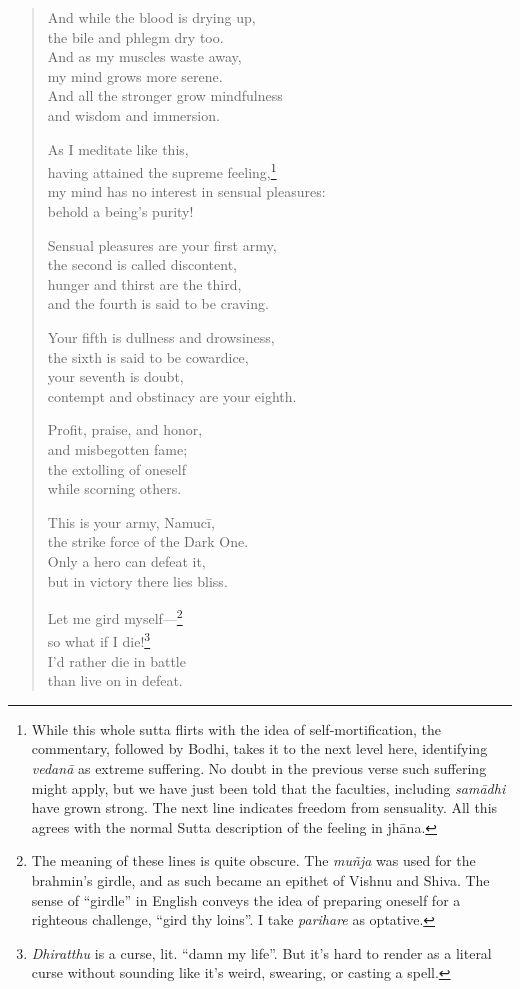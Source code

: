 \documentclass[12pt,openany]{book}%
\begin{document}
\begin{verse}
And while the blood is drying up, \\
the bile and phlegm dry too. \\
And as my muscles waste away, \\
my mind grows more serene. \\
And all the stronger grow mindfulness \\
and wisdom and immersion. 

As I meditate like this, \\
having attained the supreme feeling,\footnote{While this whole sutta flirts with the idea of self-mortification, the commentary, followed by Bodhi, takes it to the next level here, identifying \textit{\textsanskrit{vedanā}} as extreme suffering. No doubt in the previous verse such suffering might apply, but we have just been told that the faculties, including \textit{\textsanskrit{samādhi}} have grown strong. The next line indicates freedom from sensuality. All this agrees with the normal Sutta description of the feeling in \textsanskrit{jhāna}. } \\
my mind has no interest in sensual pleasures: \\
behold a being’s purity! 

Sensual pleasures are your first army, \\
the second is called discontent, \\
hunger and thirst are the third, \\
and the fourth is said to be craving. 

Your fifth is dullness and drowsiness, \\
the sixth is said to be cowardice, \\
your seventh is doubt, \\
contempt and obstinacy are your eighth. 

Profit, praise, and honor, \\
and misbegotten fame; \\
the extolling of oneself \\
while scorning others. 

This is your army, \textsanskrit{Namucī}, \\
the strike force of the Dark One. \\
Only a hero can defeat it, \\
but in victory there lies bliss. 

Let me gird myself—\footnote{The meaning of these lines is quite obscure. The \textit{\textsanskrit{muñja}} was used for the brahmin’s girdle, and as such became an epithet of Vishnu and Shiva. The sense of “girdle” in English conveys the idea of preparing oneself for a righteous challenge, “gird thy loins”. I take \textit{parihare} as optative. } \\
so what if I die!\footnote{\textit{Dhiratthu} is a curse, lit. “damn my life”. But it's hard to render as a literal curse without sounding like it’s weird, swearing, or casting a spell. } \\
I’d rather die in battle \\
than live on in defeat. 


\end{verse}
\end{document}
